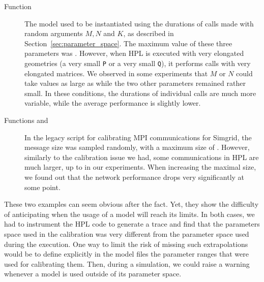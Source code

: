         \begin{description}
            \item[Function \dgemm] The model used to be instantiated using the durations of \dgemm calls made with
                random arguments \(M,N\) and \(K\), as described in Section~\ref{sec:parameter_space}. The maximum value
                of these three parameters was . However, when HPL is executed with very elongated
                geometries (\eg a very small \texttt{P} or a very small \texttt{Q}), it performs \dgemm calls with very
                elongated matrices. We observed in some experiments that \(M\) or \(N\) could take values as large as
                 while the two other parameters remained rather small. In these conditions, the durations of
                individual \dgemm calls are much more variable, while the average performance is slightly lower.
            \item[Functions \recv and \send] In the legacy script for calibrating MPI communications for Simgrid, the
                message size was sampled randomly, with a maximum size of . However, similarly to the
                \dgemm calibration issue we had, some communications in HPL are much larger, up to 
                in our experiments. When increasing the maximal size, we found out that the network performance drops
                very significantly at some point.
        \end{description}

        These two examples can seem obvious after the fact. Yet, they show the difficulty of anticipating when the usage
        of a model will reach its limits. In both cases, we had to instrument the HPL code to generate a trace and
        find that the parameters space used in the calibration was very different from the parameter space used during
        the execution. One way to limit the risk of missing such extrapolations would be to define explicitly in the
        model files the parameter ranges that were used for calibrating them. Then, during a simulation, we could raise
        a warning whenever a model is used outside of its parameter space.


